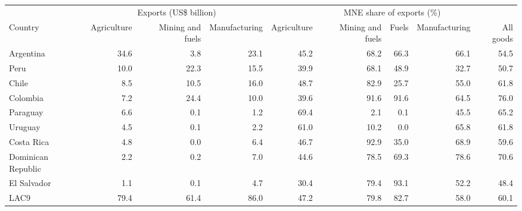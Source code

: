 \begin{tabular}{lrrrrrrrr}
\toprule
 & \multicolumn{3}{c}{Exports (US\$ billion)} & \multicolumn{5}{c}{MNE share of exports (\%)} \\
\cmidrule(lr){2-4}\cmidrule(lr){5-9}
Country & Agriculture & Mining and fuels & Manufacturing & Agriculture & Mining and fuels & Fuels & Manufacturing & All goods \\
\midrule
Argentina & 34.6 & 3.8 & 23.1 & 45.2 & 68.2 & 66.3 & 66.1 & 54.5 \\
Peru & 10.0 & 22.3 & 15.5 & 39.9 & 68.1 & 48.9 & 32.7 & 50.7 \\
Chile & 8.5 & 10.5 & 16.0 & 48.7 & 82.9 & 25.7 & 55.0 & 61.8 \\
Colombia & 7.2 & 24.4 & 10.0 & 39.6 & 91.6 & 91.6 & 64.5 & 76.0 \\
Paraguay & 6.6 & 0.1 & 1.2 & 69.4 & 2.1 & 0.1 & 45.5 & 65.2 \\
Uruguay & 4.5 & 0.1 & 2.2 & 61.0 & 10.2 & 0.0 & 65.8 & 61.8 \\
Costa Rica & 4.8 & 0.0 & 6.4 & 46.7 & 92.9 & 35.0 & 68.9 & 59.6 \\
Dominican Republic & 2.2 & 0.2 & 7.0 & 44.6 & 78.5 & 69.3 & 78.6 & 70.6 \\
El Salvador & 1.1 & 0.1 & 4.7 & 30.4 & 79.4 & 93.1 & 52.2 & 48.4 \\
\midrule
LAC9 & 79.4 & 61.4 & 86.0 & 47.2 & 79.8 & 82.7 & 58.0 & 60.1 \\
\bottomrule
\end{tabular}
